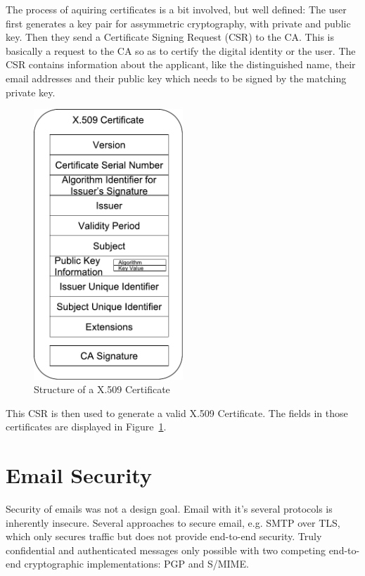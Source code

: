 The process of aquiring certificates is a bit involved, but well defined:
The user first generates a key pair for assymmetric cryptography, with private and public key.
Then they send a Certificate Signing Request (CSR) to the CA.
This is basically a request to the CA so as to certify the digital identity or the user.
The CSR contains information about the applicant, like the distinguished name, their email addresses and their public
key which needs to be signed by the matching private key.

\begin{figure}
    \centering
    \includegraphics[width=0.5\textwidth]{figures/Structure_of_X509.pdf}
    \caption{Structure of a X.509 Certificate~\cite{jagdish2016certservice}}
    \label{fig:x509Structure}
\end{figure}

This CSR is then used to generate a valid X.509 Certificate.
The fields in those certificates are displayed in Figure~\ref{fig:x509Structure}.

\section{Email Security}\label{sec:emailSecurity}

Security of emails was not a design goal.
Email with it's several protocols is inherently insecure.
Several approaches to secure email, e.g. SMTP over TLS, which only secures traffic but does not provide end-to-end
security.
Truly confidential and authenticated messages only possible with two competing end-to-end cryptographic implementations:
PGP and S/MIME\@.

